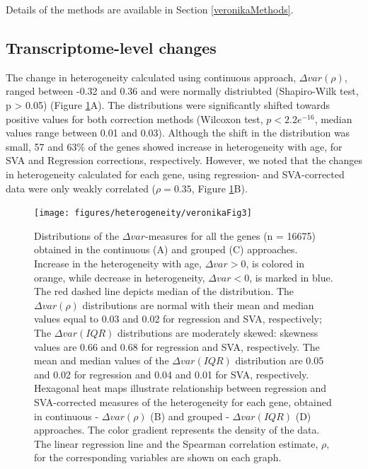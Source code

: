 \documentclass[12pt,twoside]{unicam}
\begin{document}
Details of the methods are available in Section \ref{veronikaMethods}.

\hypertarget{transcriptome-level-changes}{%
\subsection{Transcriptome-level changes}\label{transcriptome-level-changes}}

The change in heterogeneity calculated using continuous approach, \(\Delta var (\rho)\), ranged between -0.32 and 0.36 and were normally distriubted (Shapiro-Wilk test, p \textgreater{} 0.05) (Figure \ref{fig:veronikaFig3}A). The distributions were significantly shifted towards positive values for both correction methods (Wilcoxon test, \(p<2.2e^{-16}\), median values range between 0.01 and 0.03). Although the shift in the distribution was small, 57 and 63\% of the genes showed increase in heterogeneity with age, for SVA and Regression corrections, respectively. However, we noted that the changes in heterogeneity calculated for each gene, using regression- and SVA-corrected data were only weakly correlated (\(\rho = 0.35\), Figure \ref{fig:veronikaFig3}B).

\begin{figure}

{\centering \texttt{[image: figures/heterogeneity/veronikaFig3]} 

}

\caption[Transcriptome-wide change in gene expression heterogeneity in ageing, using SVA and linear regression combined with continuous and grouped approaches.]{Distributions of the $\Delta var$-measures for all the genes (n = 16675) obtained in the continuous (A) and grouped (C) approaches. Increase in the heterogeneity with age, $\Delta var > 0$, is colored in orange, while decrease in heterogeneity, $\Delta var < 0$, is marked in blue. The red dashed  line depicts median of the distribution. The $\Delta var(\rho)$ distributions are normal with their mean and median values equal to  0.03  and  0.02  for  regression  and  SVA,  respectively;  The  $\Delta var(IQR)$    distributions  are  moderately  skewed:  skewness  values  are  0.66  and  0.68  for  regression  and  SVA,  respectively.  The  mean  and  median  values  of  the  $\Delta var(IQR)$  distribution  are  0.05  and  0.02  for  regression and 0.04 and 0.01 for SVA, respectively. Hexagonal heat maps illustrate relationship between regression and SVA-corrected measures  of  the  heterogeneity  for  each  gene,  obtained  in  continuous  - $\Delta var(\rho)$  (B)  and  grouped  - $\Delta var(IQR)$  (D)  approaches.  The  color  gradient represents the density of the data. The linear regression line and the Spearman correlation estimate, $\rho$, for the corresponding variables are shown on each graph.}\label{fig:veronikaFig3}
\end{figure}
\end{document}

